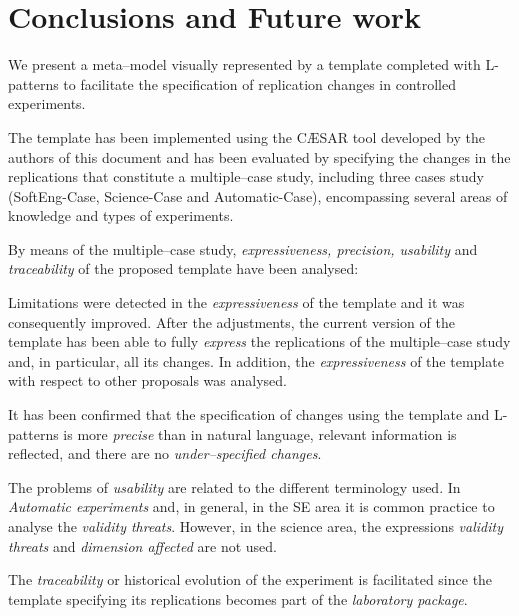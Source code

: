 
\section{Conclusions and Future work}
\label{sec:conclusions}

We present a meta--model visually represented by a template completed with L-patterns to facilitate the specification of replication changes in controlled experiments. 

The template has been implemented using the CÆSAR tool developed by the authors of this document and has been evaluated by specifying the changes in the replications that constitute a multiple--case study, including three cases study (SoftEng-Case, Science-Case and Automatic-Case), encompassing several areas of knowledge and types of experiments. 

By means of the multiple--case study, \emph{expressiveness, precision, usability} and \emph{traceability} of the proposed template have been analysed:

Limitations were detected in the \emph{expressiveness} of the template and it was consequently improved. %
After the adjustments, the current version of the template has been able to fully \emph{express} the replications of the multiple--case study and, in particular, all its changes. %
In addition, the \emph{expressiveness} of the template  with respect to other proposals was analysed.

It has been confirmed that the specification of changes using the template and L-patterns is more \emph{precise} than in natural language, relevant information is reflected, and there are no \emph{under--specified changes}.

The problems of \emph{usability} are related to the different terminology used. In \emph{Automatic experiments} and, in general, in the \gls{SE} area it is common practice to analyse the \emph{validity threats}. However, in the science area, the expressions \emph{validity threats} and \emph{dimension affected} are not used. 

The \emph{traceability} or historical evolution of the experiment is facilitated since the template specifying its replications becomes part of the \emph{laboratory package}.

